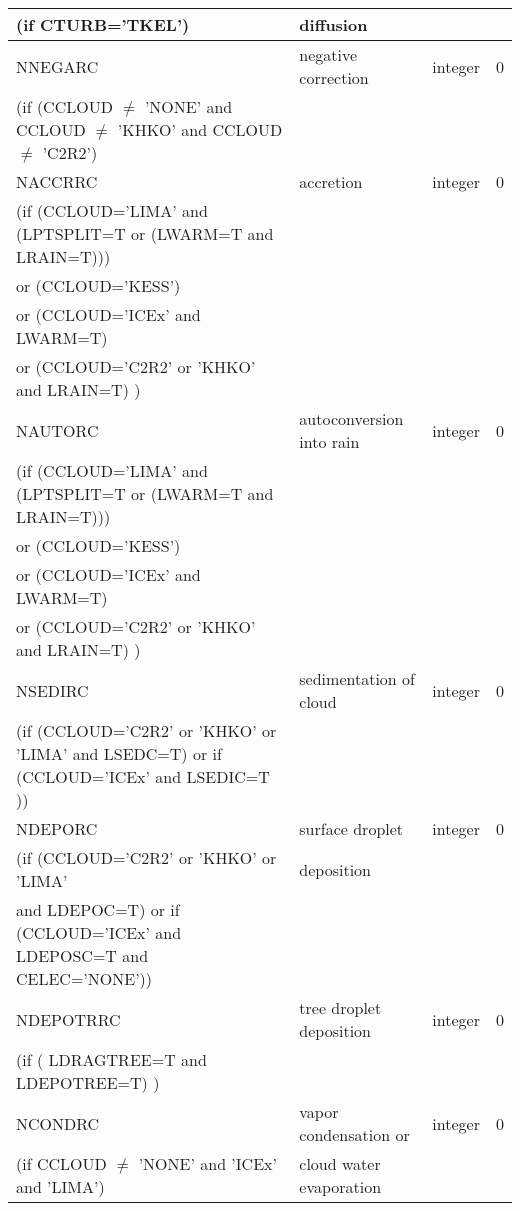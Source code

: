 \begin{longtable} {|p{}|p{}|>{\centering}p{}|p{}<{\centering}|}
(if CTURB='TKEL') &diffusion &   &  \\\hline
NNEGARC   & negative correction & integer  &  0 \index{NNEGARC!\innam{NAM\_BU\_RRC}}\\ \nopagebreak
(if (CCLOUD $\neq$ 'NONE' and CCLOUD $\neq$ 'KHKO' and CCLOUD $\neq$ 'C2R2') & &   &  \\\hline
NACCRRC  & accretion & integer  &  0 \index{NACCRC!\innam{NAM\_BU\_RRC}}\\ \nopagebreak
(if (CCLOUD='LIMA' and (LPTSPLIT=T or (LWARM=T and LRAIN=T))) & & & \\ \nopagebreak
 or (CCLOUD='KESS') & & & \\ \nopagebreak
 or (CCLOUD='ICEx' and LWARM=T) & & & \\ \nopagebreak
 or (CCLOUD='C2R2' or 'KHKO' and LRAIN=T) ) & & & \\ \hline
NAUTORC  & autoconversion into rain & integer  &  0 \index{NAUTORC!\innam{NAM\_BU\_RRC}}\\ \nopagebreak
(if (CCLOUD='LIMA' and (LPTSPLIT=T or (LWARM=T and LRAIN=T))) & & & \\ \nopagebreak
 or (CCLOUD='KESS') & & & \\ \nopagebreak
 or (CCLOUD='ICEx' and LWARM=T) & & & \\ \nopagebreak
 or (CCLOUD='C2R2' or 'KHKO' and LRAIN=T) ) & & & \\ \hline
NSEDIRC  & sedimentation of cloud   & integer  &  0 \index{NSEDIRC!\innam{NAM\_BU\_RRC}}\\ \nopagebreak
(if (CCLOUD='C2R2' or 'KHKO' or 'LIMA' and LSEDC=T) or if (CCLOUD='ICEx' and LSEDIC=T )) &  &   &   \\\hline
NDEPORC  & surface droplet   & integer  &  0 \index{NDEPORC!\innam{NAM\_BU\_RRC}}\\ \nopagebreak
(if (CCLOUD='C2R2' or 'KHKO' or 'LIMA' & deposition &   &  \\ \nopagebreak
 and LDEPOC=T) or if (CCLOUD='ICEx' and LDEPOSC=T and CELEC='NONE')) &  &   &   \\\hline
NDEPOTRRC  & tree droplet deposition   & integer  &  0 \index{NDEPOTRRC!\innam{NAM\_BU\_RRC}}\\ \nopagebreak
(if ( LDRAGTREE=T and LDEPOTREE=T) ) &  &   &   \\\hline
NCONDRC  &vapor condensation or & integer  &  0 \index{NCONDRC!\innam{NAM\_BU\_RRC}}\\ \nopagebreak
(if CCLOUD $\neq$ 'NONE' and 'ICEx' and 'LIMA') &cloud water evaporation &   &  \\\hline

\end{longtable}
